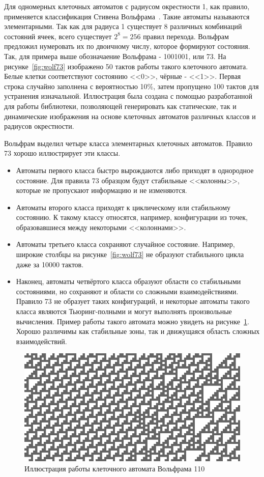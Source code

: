 \documentclass[times,specification,annotation]{itmo-student-thesis}
\begin{document}
Для одномерных клеточных автоматов с радиусом окрестности 1, как правило, применяется классификация Стивена Вольфрама~\cite{wol02}.
Такие автоматы называются элементарными.
Так как для радиуса 1 существует 8 различных комбинаций состояний ячеек, всего существует $2^8=256$ правил перехода.
Вольфрам предложил нумеровать их по двоичному числу, которое формируют состояния.
Так, для примера выше обозначаение Вольфрама - 1001001, или 73.
На рисунке~\ref{fig:wolf73} изображено 50 тактов работы такого клеточного автомата.
Белые клетки соответствуют состоянию <<0>>, чёрные - <<1>>.
Первая строка случайно заполнена с вероятностью 10\%, затем пропущено 100 тактов для устранения изначальной.
Иллюстрация была создана с помощью разработанной для работы библиотеки, позволяющей генерировать как статические, так и динамические изображения
на основе клеточных автоматов различных классов и радиусов окрестности.

Вольфрам выделил четыре класса элементарных клеточных автоматов.
Правило 73 хорошо иллюстрирует эти классы.
\begin{itemize}
    \item Автоматы первого класса быстро вырождаются либо приходят в однородное состояние.
        Для правила 73 образцом будут стабильные <<колонны>>, которые не пропускают информацию и не изменяются.
    \item Автоматы второго класса приходят к циклическому или стабильному состоянию.
        К такому классу относятся, например, конфигурации из точек, образовавшиеся между некоторыми <<колоннами>>.
    \item Автоматы третьего класса сохраняют случайное состояние.
        Например, широкие столбцы на рисунке~\ref{fig:wolf73} не образуют стабильного цикла даже за 10000 тактов.
    \item Наконец, автоматы четвёртого класса образуют области со стабильными состояниями, но сохраняют и области со сложными взаимодействиями.
        Правило 73 не образует таких конфигураций, и некоторые автоматы такого класса являются Тьюринг-полными и могут выполнять произвольные вычисления.
        Пример работы такого автомата можно увидеть на рисунке~\ref{fig:wolf110}.
        Хорошо различимы как стабильные зоны, так и движущаяся область сложных взаимодействий.
\end{itemize}

\begin{figure}[!h]
\caption{Иллюстрация работы клеточного автомата Вольфрама 110}\label{fig:wolf110}
\includegraphics[width=15cm]{graphics/rule110_e27.png}
\end{figure}
\end{document}
